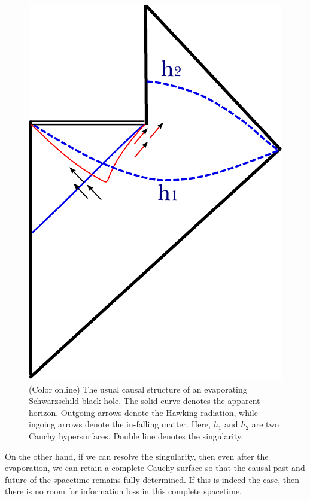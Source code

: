 \documentclass[12pt]{article}
\newcommand{\2}{$^2$}
\newcommand{\3}{$^3$}
\newcommand{\4}{$_4$}
\newcommand{\5}{$_5$}
\begin{document}
\begin{figure}
\begin{center}
\includegraphics[scale=0.75]{Schwarzschild-eps-converted-to.pdf}
\caption{\label{fig:Schwarzschild}(Color online) The usual causal structure of an evaporating Schwarzschild black hole. The solid curve denotes the apparent horizon. Outgoing arrows denote the Hawking radiation, while ingoing arrows denote the in-falling matter. Here, $h_1$ and $h_2$ are two Cauchy hypersurfaces. Double line denotes the singularity.}
\end{center}
\end{figure}

On the other hand, if we can resolve the singularity, then even after the evaporation, we can retain a complete Cauchy surface so that the causal past and future of the spacetime remains fully determined. If this is indeed the case, then there is no room for information loss in this complete spacetime.
\end{document}
